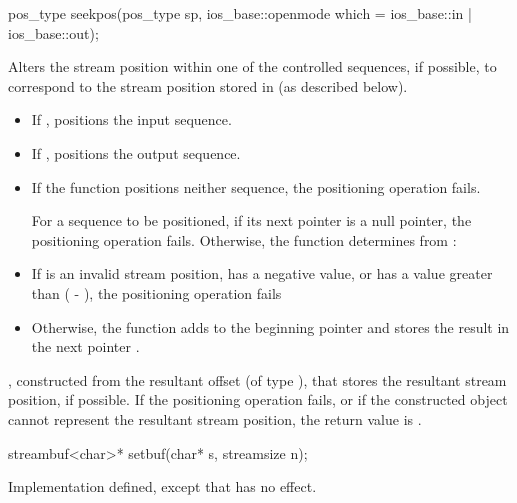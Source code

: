 %
\begin{itemdecl}
pos_type seekpos(pos_type sp, ios_base::openmode which
                  = ios_base::in | ios_base::out);
\end{itemdecl}

\begin{itemdescr}
\pnum
\effects
Alters the stream position within one of the
controlled sequences, if possible, to correspond to the
stream position stored in 
(as described below).
\begin{itemize}
\item
If
,
positions the input sequence.
\item
If
,
positions the output sequence.
\item
If the function positions neither sequence, the positioning operation fails.

\pnum
For a sequence to be positioned, if its next pointer is a null pointer,
the positioning operation fails.
Otherwise, the function determines  from
:
\item
If  is an invalid stream position,
has a negative value, or
has a value greater than ( - ),
the positioning operation fails
\item
Otherwise, the function
adds  to the beginning pointer  and
stores the result in the next pointer .
\end{itemize}

\pnum
\returns
{},
constructed from the resultant offset 
(of type
),
that stores the resultant stream position, if possible.
If the positioning operation fails, or
if the constructed object cannot represent the resultant stream position,
the return value is
.
\end{itemdescr}

%
\begin{itemdecl}
streambuf<char>* setbuf(char* s, streamsize n);
\end{itemdecl}

\begin{itemdescr}
\pnum
\effects
Implementation defined, except that
has no effect.%
\end{itemdescr}


